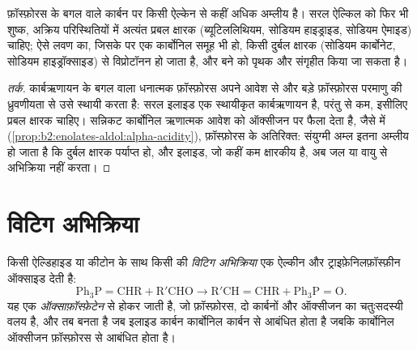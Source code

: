 \begin{proposition}[इलाइड बनाना]\label{prop:b2:wittig:ylide-acidity}
 फ़ॉस्फ़ोरस के बगल वाले कार्बन पर किसी ऐल्केन से कहीं अधिक अम्लीय है। सरल ऐल्किल
 को फिर भी शुष्क, अक्रिय परिस्थितियों में अत्यंत प्रबल क्षारक (ब्यूटिललिथियम, सोडियम हाइड्राइड, सोडियम ऐमाइड)
चाहिए; ऐसे लवण का, जिसके  पर एक कार्बोनिल समूह भी हो, किसी दुर्बल क्षारक
(सोडियम कार्बोनेट, सोडियम हाइड्रॉक्साइड) से विप्रोटॉनन हो जाता है, और बने  को पृथक और संगृहीत किया जा सकता है।
\end{proposition}

\begin{proof}[तर्क]
कार्बऋणायन के बगल वाला धनात्मक फ़ॉस्फ़ोरस अपने आवेश से और बड़े फ़ॉस्फ़ोरस परमाणु की
ध्रुवणीयता से उसे स्थायी करता है: सरल इलाइड एक स्थायीकृत कार्बऋणायन है, परंतु  से कम,
इसीलिए प्रबल क्षारक चाहिए। सन्निकट कार्बोनिल ऋणात्मक आवेश को ऑक्सीजन पर फैला देता है, जैसे  में
(\cref{prop:b2:enolates-aldol:alpha-acidity}), फ़ॉस्फ़ोरस के अतिरिक्त: संयुग्मी अम्ल इतना
अम्लीय हो जाता है कि दुर्बल क्षारक पर्याप्त हो, और इलाइड, जो कहीं कम क्षारकीय है, अब जल या वायु से अभिक्रिया नहीं करता।
\end{proof}

\section{विटिग अभिक्रिया}

\begin{definition}[विटिग अभिक्रिया]\label{def:b2:wittig:wittig}
किसी ऐल्डिहाइड या कीटोन के साथ किसी  की \emph{विटिग अभिक्रिया}
एक ऐल्कीन और ट्राइफ़ेनिलफ़ॉस्फ़ीन ऑक्साइड देती है:
\begin{equation*}
\mathrm{Ph_3P{=}CHR + R'CHO \longrightarrow R'CH{=}CHR + Ph_3P{=}O}.
\end{equation*}
यह एक \emph{ऑक्साफ़ॉस्फ़ेटेन} से होकर जाती है, जो फ़ॉस्फ़ोरस, दो
कार्बनों और ऑक्सीजन का चतुःसदस्यी वलय है, और तब बनता है जब इलाइड कार्बन कार्बोनिल कार्बन से आबंधित होता है जबकि कार्बोनिल ऑक्सीजन
फ़ॉस्फ़ोरस से आबंधित होता है।
\end{definition}

